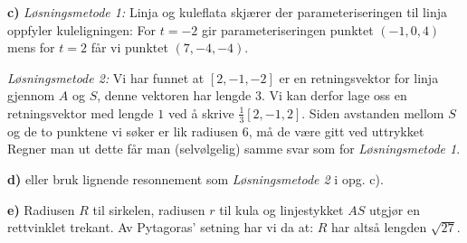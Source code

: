 \textbf{c)} \textit{Løsningsmetode 1:}
Linja og kuleflata skjærer der parameteriseringen til linja oppfyler kuleligningen:
For $ t=-2 $ gir parameteriseringen punktet $ (-1, 0, 4) $ mens for $ t=2 $ får vi punktet $ (7, -4, -4) $.

\textit{Løsningsmetode 2:} Vi har funnet at $ [2, -1, -2] $ er en retningsvektor for linja gjennom $ A $ og $ S $, denne vektoren har lengde 3. Vi kan derfor lage oss en retningsvektor med lengde $ 1 $ ved å skrive $ \frac{1}{3}[2, -1, 2] $. Siden avstanden mellom $ S $ og de to punktene vi søker er lik radiusen 6, må de være gitt ved uttrykket
Regner man ut dette får man (selvølgelig) samme svar som for \textit{Løsningsmetode 1}.

\textbf{d)}  eller bruk lignende resonnement som \textit{Løsningsmetode 2} i opg. c).

\textbf{e)} Radiusen $ R $ til sirkelen, radiusen $ r $ til kula og linjestykket $ AS $ utgjør en rettvinklet trekant. Av Pytagoras' setning har vi da at:
$ R $ har altså lengden $ \sqrt{27} $.

